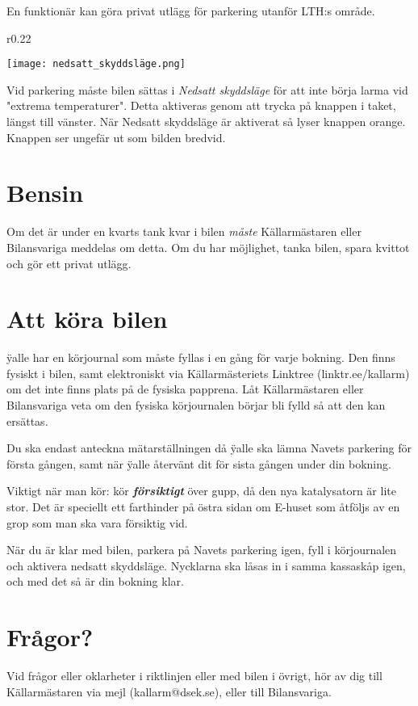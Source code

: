 \documentclass{dsekprotokoll}
\begin{document}
En funktionär kan göra privat utlägg för parkering utanför LTH:s område. 

\begin{wrapfigure}[3]{r}{0.22\textwidth}
    \raggedright
    \vspace{-0.6cm}
    \texttt{[image: nedsatt\_skyddsläge.png]}
\end{wrapfigure}

Vid parkering måste bilen sättas i \emph{Nedsatt skyddsläge} för att inte börja larma vid "extrema temperaturer". Detta aktiveras genom att trycka på knappen i taket, längst till vänster. När Nedsatt skyddsläge är aktiverat så lyser knappen orange. Knappen ser ungefär ut som bilden bredvid.

\section{Bensin} 
Om det är under en kvarts tank kvar i bilen \emph{måste} Källarmästaren eller Bilansvariga meddelas om detta. Om du har möjlighet, tanka bilen, spara kvittot och gör ett privat utlägg.

\section{Att köra bilen} 

\"yalle har en körjournal som måste fyllas i en gång för varje bokning. Den finns fysiskt i bilen, samt elektroniskt via Källarmästeriets Linktree (linktr.ee/kallarm) om det inte finns plats på de fysiska papprena. Låt Källarmästaren eller Bilansvariga veta om den fysiska körjournalen börjar bli fylld så att den kan ersättas. 

Du ska endast anteckna mätarställningen då \"yalle ska lämna Navets parkering för första gången, samt när \"yalle återvänt dit för sista gången under din bokning.

Viktigt när man kör: kör \emph{\textbf{försiktigt}} över gupp, då den nya katalysatorn är lite stor. Det är speciellt ett farthinder på östra sidan om E-huset som åtföljs av en grop som man ska vara försiktig vid. 

När du är klar med bilen, parkera på Navets parkering igen, fyll i körjournalen och aktivera nedsatt skyddsläge. Nycklarna ska låsas in i samma kassaskåp igen, och med det så är din bokning klar.


\section{Frågor?}
Vid frågor eller oklarheter i riktlinjen eller med bilen i övrigt, hör av dig till Källarmästaren via mejl (kallarm@dsek.se), eller till Bilansvariga.
\end{document}
